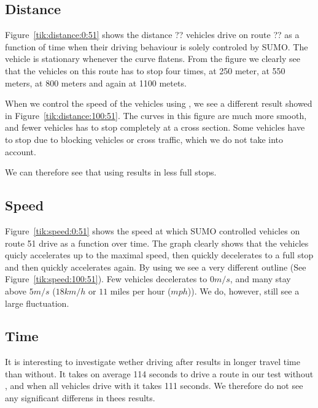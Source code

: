\subsection{Distance}
Figure~\ref{tik:distance:0:51} shows the distance ?? vehicles drive on route ?? as a function of time when their driving behaviour is solely controled by SUMO. 
The vehicle is stationary whenever the curve flatens.
From the figure we clearly see that the vehicles on this route has to stop four times, at 250 meter, at 550 meters, at 800 meters and again at 1100 metets.

When we control the speed of the vehicles using \tech, we see a different result showed in Figure~\ref{tik:distance:100:51}.
The curves in this figure are much more smooth, and fewer vehicles has to stop completely at a cross section.
Some vehicles have to stop due to blocking vehicles or cross traffic, which we do not take into account.

We can therefore see that using \tech results in less full stops.



\subsection{Speed}
Figure~\ref{tik:speed:0:51} shows the speed at which SUMO controlled vehicles on route 51 drive as a function over time.
The graph clearly shows that the vehicles quicly accelerates up to the maximal speed, then quickly decelerates to a full stop and then quickly accelerates again.
By using \tech we see a very different outline (See Figure~\ref{tik:speed:100:51}).
Few vehicles decelerates to $0 m/s$, and many stay above $5 m/s$ ($18 km/h$ or $11$ miles per hour ($mph$)).
We do, however, still see a large fluctuation.



\subsection{Time}
It is interesting to investigate wether driving after \tech results in longer travel time than without.
It takes on average 114 seconds to drive a route in our test without \tech, and when all vehicles drive with \tech it takes 111 seconds. 
We therefore do not see any significant differens in thees results.


